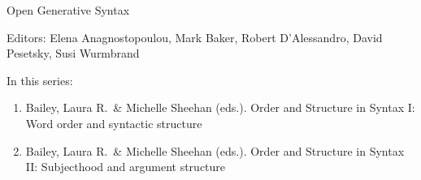 {\large Open Generative Syntax}

\bigskip

Editors: Elena Anagnostopoulou, Mark Baker, Robert D'Alessandro, David
Pesetsky, Susi Wurmbrand

\bigskip

In this series:

\begin{enumerate}

\item Bailey, Laura R.\ \& Michelle Sheehan (eds.). Order and Structure in
    Syntax I: Word order and syntactic structure

\item Bailey, Laura R.\ \& Michelle Sheehan (eds.). Order and Structure in
    Syntax II: Subjecthood and argument structure

\end{enumerate}

